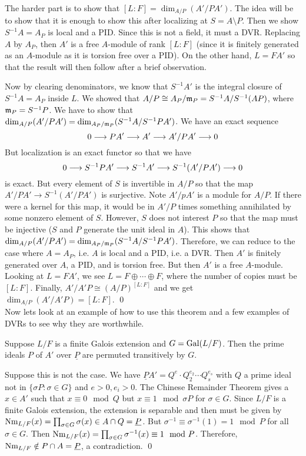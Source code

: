 The harder part is to show that $[L:F]=\dim_{A/P}(A'/PA')$. The idea will be to show that it is enough to show this after localizing at $S=A \setminus P$. Then we show $S^{-1}A=A_P$ is local and a PID. Since this is not a field, it must a DVR. Replacing $A$ by $A_P$, then $A'$ is a free $A$-module of rank $[L:F]$ (since it is finitely generated as an $A$-module as it is torsion free over a PID). On the other hand, $L=FA'$ so that the result will then follow after a brief observation. 

Now by clearing denominators, we know that $S^{-1}A'$ is the integral closure of $S^{-1}A=A_P$ inside $L$. We showed that $A/P \cong A_P/\mathfrak{m}_P= S^{-1}A/S^{-1}(AP)$, where $\mathfrak{m}_P=S^{-1}P$. We have to show that $\dim_{A/P}(A'/PA') = \dim_{A_P/\mathfrak{m}_P}(S^{-1}A/S^{-1}PA')$. We have an exact sequence
	\[
	0 \stackrel{}{\longrightarrow} PA' \stackrel{}{\longrightarrow} A' \stackrel{}{\longrightarrow} A'/PA' \stackrel{}{\longrightarrow} 0
	\]
But localization is an exact functor so that we have
	\[
	0 \stackrel{}{\longrightarrow} S^{-1}PA' \stackrel{}{\longrightarrow} S^{-1}A' \stackrel{}{\longrightarrow} S^{-1}(A'/PA') \stackrel{}{\longrightarrow} 0
	\]
is exact. But every element of $S$ is invertible in $A/P$ so that the map $A'/PA' \to S^{-1}(A'/PA')$ is surjective. Note $A'/pA'$ is a module for $A/P$. If there were a kernel for this map, it would be in $A'/P$ times something annihilated by some nonzero element of $S$. However, $S$ does not interest $P$ so that the map must be injective ($S$ and $P$ generate the unit ideal in $A$). This shows that $\dim_{A/P}(A'/PA') = \dim_{A_P/\mathfrak{m}_P}(S^{-1}A/S^{-1}PA')$. Therefore, we can reduce to the case where $A=A_P$, i.e. $A$ is local and a PID, i.e. a DVR. Then $A'$ is finitely generated over $A$, a PID, and is torsion free. But then $A'$ is a free $A$-module. Looking at $L=FA'$, we see $L=F \oplus \cdots \oplus F$, where the number of copies must be $[L:F]$. Finally, $A'/A'P \cong (A/P)^{[L:F]}$ and we get $\dim_{A/P}(A'/A'P)=[L:F]$. \qed \\


Now lets look at an example of how to use this theorem and a few examples of DVRs to see why they are worthwhile. 

\begin{lem}
Suppose $L/F$ is a finite Galois extension and $G=\operatorname{Gal}(L/F)$. Then the prime ideals $P$ of $A'$ over $\underline{P}$ are permuted transitively by $G$. 
\end{lem}

\pf Suppose this is not the case. We have $\underline{P}A'= Q^{e} \cdot Q_2^{e_2} \cdots Q_s^{e_s}$ with $Q$ a prime ideal not in $\{ \sigma P \colon \sigma \in G\}$ and $e>0,e_i>0$. The Chinese Remainder Theorem gives a $x \in A'$ such that $x \equiv 0 \mod Q$ but $x \equiv 1 \mod \sigma P$ for $\sigma \in G$. Since $L/F$ is a finite Galois extension, the extension is separable and then must be given by $\text{Nm}_{L/F}(x)=\prod_{\sigma \in G} \sigma(x) \in A \cap Q=\underline{P}$. But $\sigma^{-1} \equiv \sigma^{-1}(1)=1 \mod P$ for all $\sigma \in G$. Then $\text{Nm}_{L/F}(x)= \prod_{\sigma \in G} \sigma^{-1}(x) \equiv 1 \mod P$. Therefore, $\text{Nm}_{L/F} \notin P \cap A=\underline{P}$, a contradiction. \qed \\ 


